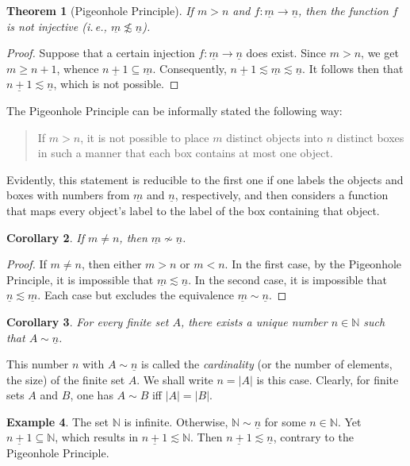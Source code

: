 \documentclass[12pt,notitlepage]{article}
\theoremstyle{plain}
\newtheorem{thm}{Theorem}[section]
\newtheorem{corr}[thm]{Corollary}
\theoremstyle{definition}
\newtheorem{exm}[thm]{Example}
\theoremstyle{plain}
\newcommand{\N}{\mathbb{N}}
\newcommand{\sbs}{\subseteq}
\newcommand{\ul}[1]{\underline{#1}}
\newcommand{\1}{\mathbf{1}}
\newcommand{\0}{\mathbf{0}}
\begin{document}
\begin{thm}[Pigeonhole Principle]\label{L10:dirichlet}
If $m > n$ and $f\colon \ul{m} \to \ul{n}$, then the function $f$ is not injective \emph{(}i.\,e., $\ul{m} \not\lesssim \ul{n}$\emph{)}.
\end{thm}
\begin{proof}
Suppose that a certain injection $f\colon \ul{m} \to \ul{n}$ does exist. Since $m > n$, we get $m \geq n + 1$, whence $\ul{n+1} \sbs \ul{m}$. Consequently, $\ul{n+1} \lesssim \ul{m} \lesssim \ul{n}$. It follows then that $\ul{n+1} \lesssim \ul{n}$, which is not possible.
\end{proof}
\noindent The Pigeonhole Principle can be informally stated the following way:
\begin{quote}
If $m > n$, it is not possible to place $m$ distinct objects into $n$ distinct boxes in such a manner that each box contains at most one object.
\end{quote}
Evidently, this statement is reducible to the first one if one labels the objects and boxes with numbers from $\ul{m}$ and $\ul{n}$, respectively, and then considers a function that maps   every object's label to the label of the box containing that object.

\begin{corr}
If $m \neq n$, then $\ul{m} \nsim \ul{n}$.
\end{corr}
\begin{proof}
If $m \neq n$, then either $m > n$ or $m < n$. In the first case, by the Pigeonhole Principle, it is impossible that $\ul{m} \lesssim \ul{n}$. In the second case, it is impossible that $\ul{n} \lesssim \ul{m}$. Each case but excludes the equivalence $\ul{m} \sim \ul{n}$.
\end{proof}

\begin{corr}
For every finite set $A$, there exists a \emph{unique} number $n\in \N$ such that $A \sim \ul{n}$.
\end{corr}
This number $n$ with $A \sim \ul{n}$ is called the \emph{cardinality} (or the number of elements, the size) of the finite set $A$. We shall write $n = |A|$ is this case. Clearly, for finite sets $A$ and $B$, one has $A \sim B$ iff $|A| = |B|$.

\begin{exm}\label{L10:N_fin}
The set $\N$ is infinite. Otherwise, $\N \sim \ul{n}$ for some $n \in \N$. Yet $\ul{n+1} \sbs \N$, which results in $\ul{n+1} \lesssim \N$. Then $\ul{n+1} \lesssim \ul{n}$, contrary to the Pigeonhole Principle.
\end{exm}
\end{document}
